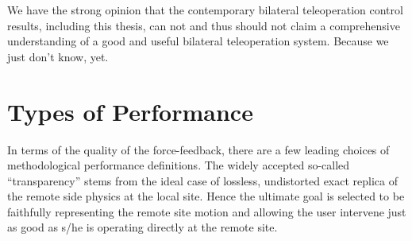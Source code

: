 We have the strong opinion that the contemporary bilateral teleoperation control results, including this thesis, 
can not and thus should not claim a comprehensive understanding of a good and useful bilateral teleoperation 
system. Because we just don't know, yet.

\section{Types of Performance}

In terms of the quality of the force-feedback, there are a few leading choices of methodological performance 
definitions. The widely accepted so-called \enquote{transparency} stems from the ideal case of lossless, undistorted
exact replica of the remote side physics at the local site. Hence the ultimate goal is selected to be 
faithfully representing the remote site motion and allowing the user intervene just as good as s/he is operating 
directly at the remote site. 

